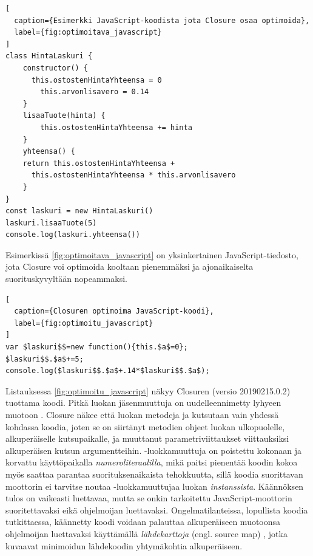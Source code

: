 \begin{lstlisting}[
  caption={Esimerkki JavaScript-koodista jota Closure osaa optimoida},
  label={fig:optimoitava_javascript}
]
class HintaLaskuri {
	constructor() {
	  this.ostostenHintaYhteensa = 0
		this.arvonlisavero = 0.14
	}
	lisaaTuote(hinta) {
		this.ostostenHintaYhteensa += hinta
	}
	yhteensa() {
    return this.ostostenHintaYhteensa +
      this.ostostenHintaYhteensa * this.arvonlisavero
	}
}
const laskuri = new HintaLaskuri()
laskuri.lisaaTuote(5)
console.log(laskuri.yhteensa())
\end{lstlisting}
Esimerkissä \ref{fig:optimoitava_javascript} on yksinkertainen
JavaScript-tiedosto, jota Closure voi optimoida kooltaan pienemmäksi
ja ajonaikaiselta suorituskyvyltään nopeammaksi.
\begin{lstlisting}[
  caption={Closuren optimoima JavaScript-koodi},
  label={fig:optimoitu_javascript}
]
var $laskuri$$=new function(){this.$a$=0};
$laskuri$$.$a$+=5;
console.log($laskuri$$.$a$+.14*$laskuri$$.$a$);
\end{lstlisting}
Listauksessa \ref{fig:optimoitu_javascript} näkyy Closuren (versio 20190215.0.2)
tuottama koodi. Pitkä luokan  jäsenmuuttuja
 on uudelleennimetty lyhyeen muotoon
. Closure näkee että luokan  metodeja\newline
{} ja  kutsutaan
vain yhdessä kohdassa koodia, joten se on siirtänyt metodien ohjeet luokan
ulkopuolelle, alkuperäiselle kutsupaikalle, ja muuttanut parametriviittaukset
viittauksiksi alkuperäisen kutsun argumentteihin.\newline
{}-luokkamuuttuja
on poistettu kokonaan ja korvattu käyttöpaikalla\newline
{} \textit{numeroliteraalilla},
mikä paitsi pienentää koodin kokoa myös saattaa parantaa suorituksenaikaista
tehokkuutta, sillä koodia suorittavan moottorin ei
tarvitse noutaa\newline
{}-luokkamuuttujaa
luokan \textit{instanssista}. Käännöksen tulos on vaikeasti
luettavaa, mutta se onkin tarkoitettu JavaScript-moottorin suoritettavaksi
eikä ohjelmoijan luettavaksi. Ongelmatilanteissa, lopullista koodia
tutkittaessa, käännetty koodi voidaan palauttaa
alkuperäiseen muotoonsa ohjelmoijan luettavaksi käyttämällä \textit{lähdekarttoja}
(engl. source map) \cite{SourceMapMDN, SourceMapsDocsClosure},
jotka kuvaavat minimoidun lähdekoodin yhtymäkohtia alkuperäiseen.


